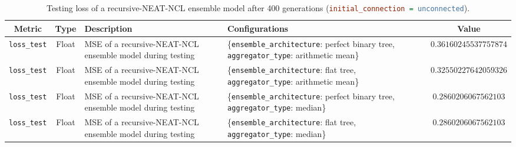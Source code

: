 \begin{table}[H]
    \centering
    \begin{tabular}{|c|c|p{4cm}|p{5cm}|c|}
        \hline
        Metric & Type & Description & Configurations & Value \\
        \hline
        \small\texttt{loss\_test} & Float & MSE of a recursive-NEAT-NCL ensemble model during testing & \{\texttt{ensemble\_architecture}: perfect binary tree, \texttt{aggregator\_type}: arithmetic mean\} & $0.36160245537757874$ \\
        \hline
        \small\texttt{loss\_test} & Float & MSE of a recursive-NEAT-NCL ensemble model during testing & \{\texttt{ensemble\_architecture}: flat tree, \texttt{aggregator\_type}: arithmetic mean\} & $0.32550227642059326$ \\
        \hline
        \small\texttt{loss\_test} & Float & MSE of a recursive-NEAT-NCL ensemble model during testing & \{\texttt{ensemble\_architecture}: perfect binary tree, \texttt{aggregator\_type}: median\} & $0.2860206067562103$ \\
        \hline
        \small\texttt{loss\_test} & Float & MSE of a recursive-NEAT-NCL ensemble model during testing & \{\texttt{ensemble\_architecture}: flat tree, \texttt{aggregator\_type}: median\} & $0.2860206067562103$ \\
        \hline
    \end{tabular}
    \caption{Testing loss of a recursive-NEAT-NCL ensemble model after 400 generations (\lstinline[language=ini]|initial_connection = unconnected|). }
    \label{table:experiment_6_neat_ncl_unconnected}
\end{table}


